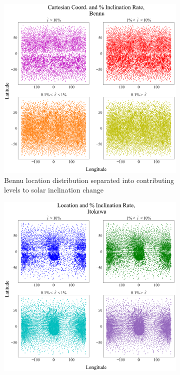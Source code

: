 \begin{figure}[H]
    \begin{subfigure}{0.49\textwidth}
        \centering
        \includegraphics[width=\textwidth]{fig/location_dists_bennu.png}
        \caption{Bennu location distribution separated into contributing levels to solar inclination change}
    \end{subfigure}
    \hfill
    \begin{subfigure}{0.49\textwidth}
        \centering
        \includegraphics[width=\textwidth]{fig/location_dists_itokawa.png}

\end{subfigure}
\end{figure}
